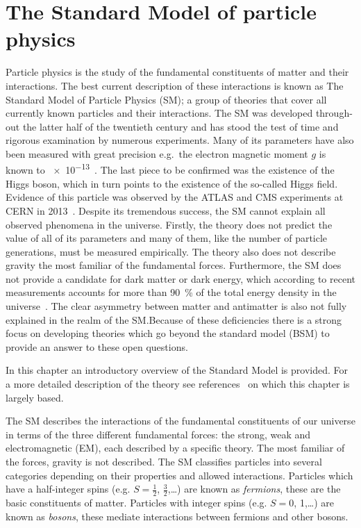 \newcommand\scalemath[2]{\scalebox{#1}{\mbox{\ensuremath{\displaystyle #2}}}}
\chapter{The Standard Model of particle physics}
\label{ch:Theory}

Particle physics is the study of the fundamental constituents of matter and their interactions. The best current description of these interactions is known as The Standard Model of Particle Physics (SM); a group of theories that cover all currently known particles and their interactions. The SM was developed through-out the latter half of the twentieth century and has stood the test of time and rigorous examination by numerous experiments. Many of its parameters have also been measured with great precision e.g.\ the electron magnetic moment $g$ is known to \num{e-13}~\cite{Theory:AwesomeSM}. The last piece to be confirmed was the existence of the Higgs boson, which in turn points to the existence of the so-called Higgs field. Evidence of this particle was observed by the ATLAS and CMS experiments at CERN in 2013~\cite{Theory:HiggsDiscoveryATLAS,Theory:HiggsDiscoveryCMS}.
Despite its tremendous success, the SM cannot explain all observed phenomena in the universe. Firstly, the theory does not predict the value of all of its parameters and many of them, like the number of particle generations, must be measured empirically. The theory also does not describe gravity the most familiar of the fundamental forces. Furthermore, the SM does not provide a candidate for dark matter or dark energy, which according to recent measurements accounts for more than \SI{90}{\percent} of the total energy density in the universe~\cite{Theory:DarkMatter}. The clear asymmetry between matter and antimatter is also not fully explained in the realm of the SM.\@ Because of these deficiencies there is a strong focus on developing theories which go beyond the standard model (BSM) to provide an answer to these open questions.

In this chapter an introductory overview of the Standard Model is provided. For a more detailed description of the theory see references~\cite{Theory:Perkins,Theory:IntroGriffiths} on which this chapter is largely based.

The SM describes the interactions of the fundamental constituents of our universe in terms of the three different fundamental forces: the strong, weak and electromagnetic (EM), each described by a specific theory. The most familiar of the forces, gravity is not described. The SM classifies particles into several categories depending on their properties and allowed interactions. Particles which have a half-integer spins (e.g. $S=\frac{1}{2}$, $\frac{3}{2}$,\ldots) are known as \emph{fermions}, these are the basic constituents of matter. Particles with integer spins (e.g. $S=0$, 1,\ldots) are known as \emph{bosons}, these mediate interactions between fermions and other bosons.

